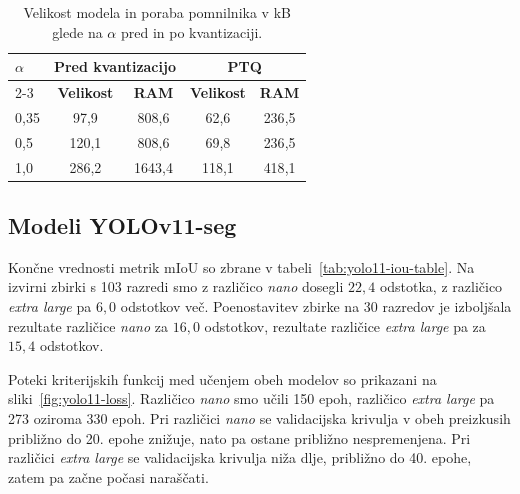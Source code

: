 \documentclass[a4paper,twoside,openright,12pt,slovene]{book}
\begin{document}
            \begin{table}[t]
                \centering
                \begin{tabular}{|l|cc|cc|}
                    \toprule
                    \multirow{2}{*}{\textbf{$\alpha$}} & \multicolumn{2}{c|}{\textbf{Pred kvantizacijo}} & \multicolumn{2}{c|}{\textbf{PTQ}} \\
                    \cline{2-3} \cline{4-5}
                    & \textbf{Velikost} & \textbf{RAM} & \textbf{Velikost} & \textbf{RAM} \\
                    \midrule
                    0{,}35 & 97{,}9 & 808{,}6 & 62{,}6  &  236{,}5  \\
                    0{,}5  & 120{,}1 & 808{,}6 & 69{,}8  &  236{,}5  \\
                    1{,}0  & 286{,}2 & 1643{,}4 & 118{,}1  &  418{,}1  \\
                    \bottomrule
                \end{tabular}
                \caption[Velikost modela in poraba pomnilnika pred in po kvantizaciji]{Velikost modela in poraba pomnilnika v kB glede na \(\alpha\) pred in po kvantizaciji.}
                \label{tab:alpha-size-ram}
            \end{table}


        \subsection{Modeli YOLOv11-seg}

            Končne vrednosti metrik mIoU so zbrane v
            tabeli~\ref{tab:yolo11-iou-table}.
            Na izvirni zbirki s 103 razredi smo z različico \textit{nano} dosegli
            $22{,}4$ odstotka, z različico \textit{extra large} pa $6{,}0$ odstotkov
            več. Poenostavitev zbirke na 30 razredov je izboljšala rezultate različice \textit{nano} za
            $16{,}0$ odstotkov, rezultate različice \textit{extra large} pa za $15{,}4$ odstotkov.

            Poteki kriterijskih funkcij med učenjem obeh modelov so prikazani
            na
            sliki~\ref{fig:yolo11-loss}.
            Različico \textit{nano} smo učili 150 epoh, različico \textit{extra
            large} pa 273 oziroma 330 epoh. Pri različici \textit{nano} se
            validacijska krivulja v obeh preizkusih približno do 20. epohe
            znižuje, nato pa ostane približno nespremenjena. Pri različici
            \textit{extra large} se validacijska krivulja niža dlje,
            približno do 40. epohe, zatem pa začne počasi naraščati.
\end{document}
